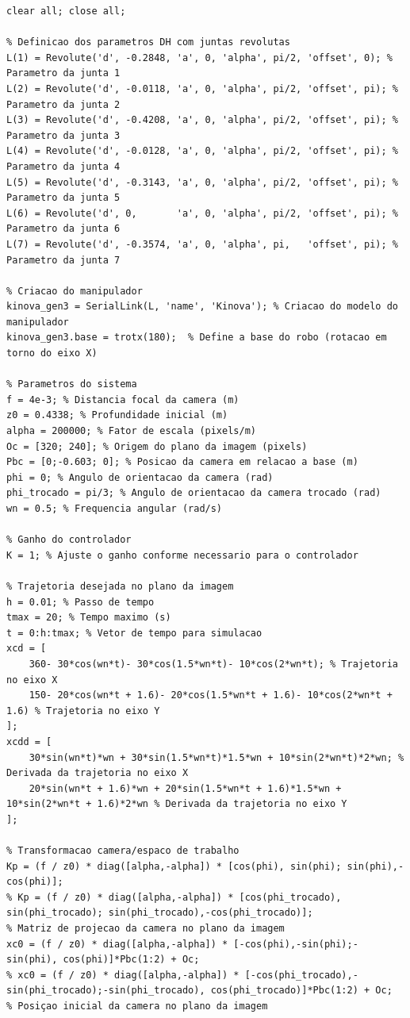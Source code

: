 \documentclass[10pt]{article}
\begin{document}
\newpage

\begin{lstlisting}[caption={Código da segunda parte do trabalho}, label={code:subsecao22}]
clear all; close all;

% Definicao dos parametros DH com juntas revolutas
L(1) = Revolute('d', -0.2848, 'a', 0, 'alpha', pi/2, 'offset', 0); % Parametro da junta 1
L(2) = Revolute('d', -0.0118, 'a', 0, 'alpha', pi/2, 'offset', pi); % Parametro da junta 2
L(3) = Revolute('d', -0.4208, 'a', 0, 'alpha', pi/2, 'offset', pi); % Parametro da junta 3
L(4) = Revolute('d', -0.0128, 'a', 0, 'alpha', pi/2, 'offset', pi); % Parametro da junta 4
L(5) = Revolute('d', -0.3143, 'a', 0, 'alpha', pi/2, 'offset', pi); % Parametro da junta 5
L(6) = Revolute('d', 0,       'a', 0, 'alpha', pi/2, 'offset', pi); % Parametro da junta 6
L(7) = Revolute('d', -0.3574, 'a', 0, 'alpha', pi,   'offset', pi); % Parametro da junta 7

% Criacao do manipulador
kinova_gen3 = SerialLink(L, 'name', 'Kinova'); % Criacao do modelo do manipulador
kinova_gen3.base = trotx(180);  % Define a base do robo (rotacao em torno do eixo X)

% Parametros do sistema
f = 4e-3; % Distancia focal da camera (m)
z0 = 0.4338; % Profundidade inicial (m)
alpha = 200000; % Fator de escala (pixels/m)
Oc = [320; 240]; % Origem do plano da imagem (pixels)
Pbc = [0;-0.603; 0]; % Posicao da camera em relacao a base (m)
phi = 0; % Angulo de orientacao da camera (rad)
phi_trocado = pi/3; % Angulo de orientacao da camera trocado (rad)
wn = 0.5; % Frequencia angular (rad/s)

% Ganho do controlador
K = 1; % Ajuste o ganho conforme necessario para o controlador

% Trajetoria desejada no plano da imagem
h = 0.01; % Passo de tempo
tmax = 20; % Tempo maximo (s)
t = 0:h:tmax; % Vetor de tempo para simulacao
xcd = [
    360- 30*cos(wn*t)- 30*cos(1.5*wn*t)- 10*cos(2*wn*t); % Trajetoria no eixo X
    150- 20*cos(wn*t + 1.6)- 20*cos(1.5*wn*t + 1.6)- 10*cos(2*wn*t + 1.6) % Trajetoria no eixo Y
];
xcdd = [
    30*sin(wn*t)*wn + 30*sin(1.5*wn*t)*1.5*wn + 10*sin(2*wn*t)*2*wn; % Derivada da trajetoria no eixo X
    20*sin(wn*t + 1.6)*wn + 20*sin(1.5*wn*t + 1.6)*1.5*wn + 10*sin(2*wn*t + 1.6)*2*wn % Derivada da trajetoria no eixo Y
];

% Transformacao camera/espaco de trabalho
Kp = (f / z0) * diag([alpha,-alpha]) * [cos(phi), sin(phi); sin(phi),-cos(phi)]; 
% Kp = (f / z0) * diag([alpha,-alpha]) * [cos(phi_trocado), sin(phi_trocado); sin(phi_trocado),-cos(phi_trocado)];
% Matriz de projecao da camera no plano da imagem
xc0 = (f / z0) * diag([alpha,-alpha]) * [-cos(phi),-sin(phi);-sin(phi), cos(phi)]*Pbc(1:2) + Oc;
% xc0 = (f / z0) * diag([alpha,-alpha]) * [-cos(phi_trocado),-sin(phi_trocado);-sin(phi_trocado), cos(phi_trocado)]*Pbc(1:2) + Oc;
% Posiçao inicial da camera no plano da imagem


\end{lstlisting}
\end{document}
